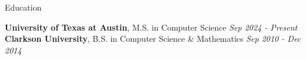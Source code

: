 \documentclass[
	10pt, %
]{resume} %
\begin{document}

\begin{rSection}{Education}

    \textbf{University of Texas at Austin}, M.S. in Computer Science \hfill \textit{Sep 2024 - Present} \\ 
    \textbf{Clarkson University}, B.S. in Computer Science \& Mathematics \hfill \textit{Sep 2010 - Dec 2014}
	
\end{rSection}

\end{document}
